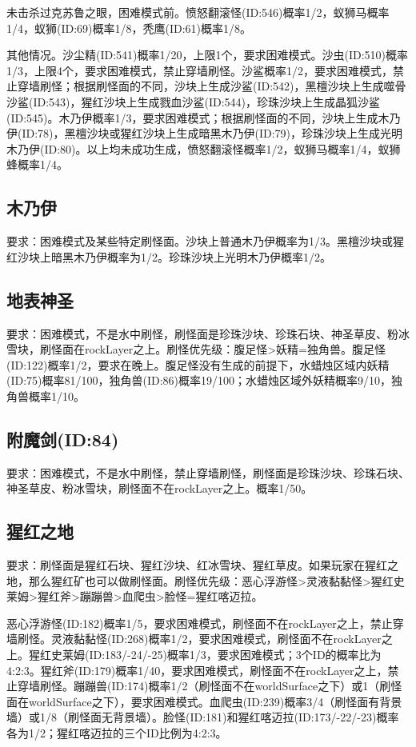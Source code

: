 未击杀过克苏鲁之眼，困难模式前。愤怒翻滚怪(ID:546)概率1/2，蚁狮马概率1/4，蚁狮(ID:69)概率1/8，秃鹰(ID:61)概率1/8。

其他情况。沙尘精(ID:541)概率1/20，上限1个，要求困难模式。沙虫(ID:510)概率1/3，上限4个，要求困难模式，禁止穿墙刷怪。沙鲨概率1/2，要求困难模式，禁止穿墙刷怪；根据刷怪面的不同，沙块上生成沙鲨(ID:542)，黑檀沙块上生成噬骨沙鲨(ID:543)，猩红沙块上生成戮血沙鲨(ID:544)，珍珠沙块上生成晶狐沙鲨(ID:545)。木乃伊概率1/3，要求困难模式；根据刷怪面的不同，沙块上生成木乃伊(ID:78)，黑檀沙块或猩红沙块上生成暗黑木乃伊(ID:79)，珍珠沙块上生成光明木乃伊(ID:80)。以上均未成功生成，愤怒翻滚怪概率1/2，蚁狮马概率1/4，蚁狮蜂概率1/4。

\subsection{木乃伊}
要求：困难模式及某些特定刷怪面。沙块上普通木乃伊概率为1/3。黑檀沙块或猩红沙块上暗黑木乃伊概率为1/2。珍珠沙块上光明木乃伊概率1/2。

\subsection{地表神圣}
要求：困难模式，不是水中刷怪，刷怪面是珍珠沙块、珍珠石块、神圣草皮、粉冰雪块，刷怪面在rockLayer之上。刷怪优先级：腹足怪>妖精=独角兽。腹足怪(ID:122)概率1/2，要求在晚上。腹足怪没有生成的前提下，水蜡烛区域内妖精(ID:75)概率81/100，独角兽(ID:86)概率19/100；水蜡烛区域外妖精概率9/10，独角兽概率1/10。

\subsection{附魔剑(ID:84)}
要求：困难模式，不是水中刷怪，禁止穿墙刷怪，刷怪面是珍珠沙块、珍珠石块、神圣草皮、粉冰雪块，刷怪面不在rockLayer之上。概率1/50。

\subsection{猩红之地}
要求：刷怪面是猩红石块、猩红沙块、红冰雪块、猩红草皮。如果玩家在猩红之地，那么猩红矿也可以做刷怪面。刷怪优先级：恶心浮游怪>灵液黏黏怪>猩红史莱姆>猩红斧>蹦蹦兽>血爬虫>脸怪=猩红喀迈拉。

恶心浮游怪(ID:182)概率1/5，要求困难模式，刷怪面不在rockLayer之上，禁止穿墙刷怪。灵液黏黏怪(ID:268)概率1/2，要求困难模式，刷怪面不在rockLayer之上。猩红史莱姆(ID:183/-24/-25)概率1/3，要求困难模式；3个ID的概率比为4:2:3。猩红斧(ID:179)概率1/40，要求困难模式，刷怪面不在rockLayer之上，禁止穿墙刷怪。蹦蹦兽(ID:174)概率1/2（刷怪面不在worldSurface之下）或1（刷怪面在worldSurface之下），要求困难模式。血爬虫(ID:239)概率3/4（刷怪面有背景墙）或1/8（刷怪面无背景墙）。脸怪(ID:181)和猩红喀迈拉(ID:173/-22/-23)概率各为1/2；猩红喀迈拉的三个ID比例为4:2:3。

